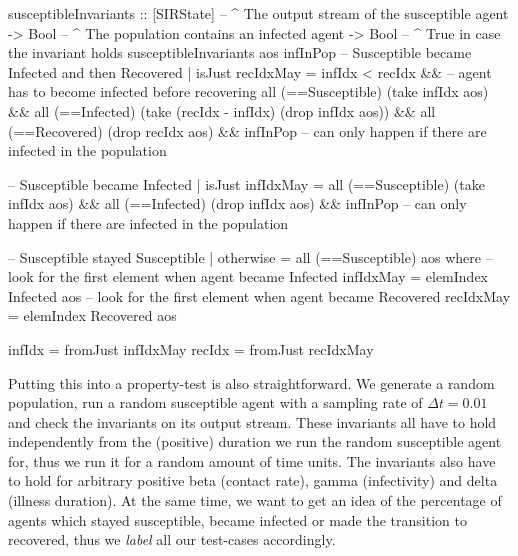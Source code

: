 \begin{HaskellCode}
susceptibleInvariants :: [SIRState] -- ^ The output stream of the susceptible agent 
                      -> Bool       -- ^ The population contains an infected agent
                      -> Bool       -- ^ True in case the invariant holds
susceptibleInvariants aos infInPop
    -- Susceptible became Infected and then Recovered
    | isJust recIdxMay 
      = infIdx < recIdx &&  -- agent has to become infected before recovering
        all (==Susceptible) (take infIdx aos) && 
        all (==Infected) (take (recIdx - infIdx) (drop infIdx aos)) && 
        all (==Recovered) (drop recIdx aos) &&
        infInPop  -- can only happen if there are infected in the population

    -- Susceptible became Infected
    | isJust infIdxMay 
      = all (==Susceptible) (take infIdx aos) &&
        all (==Infected) (drop infIdx aos) &&
        infInPop -- can only happen if there are infected in the population

    -- Susceptible stayed Susceptible
    | otherwise = all (==Susceptible) aos
  where
    -- look for the first element when agent became Infected
    infIdxMay = elemIndex Infected aos
    -- look for the first element when agent became Recovered
    recIdxMay = elemIndex Recovered aos

    infIdx = fromJust infIdxMay
    recIdx = fromJust recIdxMay
\end{HaskellCode}

Putting this into a property-test is also straightforward. We generate a random population, run a random susceptible agent with a sampling rate of $\Delta t = 0.01$ and check the invariants on its output stream. These invariants all have to hold independently from the (positive) duration we run the random susceptible agent for, thus we run it for a random amount of time units. The invariants also have to hold for arbitrary positive beta (contact rate), gamma (infectivity) and delta (illness duration). At the same time, we want to get an idea of the percentage of agents which stayed susceptible, became infected or made the transition to recovered, thus we \textit{label} all our test-cases accordingly.

